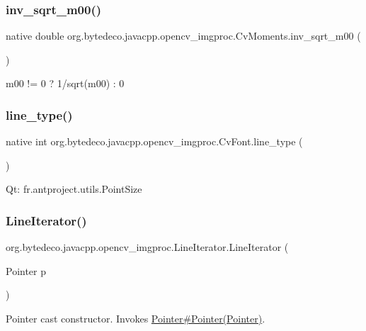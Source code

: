 \subsubsection{\texorpdfstring{inv\+\_\+sqrt\+\_\+m00()}{inv\_sqrt\_m00()}}
{\footnotesize\ttfamily native double org.\+bytedeco.\+javacpp.\+opencv\+\_\+imgproc.\+Cv\+Moments.\+inv\+\_\+sqrt\+\_\+m00 (\begin{DoxyParamCaption}{ }\end{DoxyParamCaption})}

m00 != 0 ? 1/sqrt(m00) \+: 0 \mbox{\label{group__imgproc_gaa10a37186c21769dac36657ca65b282c}} 
\subsubsection{\texorpdfstring{line\+\_\+type()}{line\_type()}}
{\footnotesize\ttfamily native int org.\+bytedeco.\+javacpp.\+opencv\+\_\+imgproc.\+Cv\+Font.\+line\+\_\+type (\begin{DoxyParamCaption}{ }\end{DoxyParamCaption})}

Qt\+: fr.antproject.utils.Point\+Size \mbox{\label{group__imgproc_gab596cb042f00fd0833e914b7ea024342}}
\subsubsection{\texorpdfstring{Line\+Iterator()}{LineIterator()}\hspace{0.1cm}{\footnotesize\ttfamily [1/2]}}
{\footnotesize\ttfamily org.\+bytedeco.\+javacpp.\+opencv\+\_\+imgproc.\+Line\+Iterator.\+Line\+Iterator (\begin{DoxyParamCaption}\item[{Pointer}]{p }\end{DoxyParamCaption})\hspace{0.3cm}{\ttfamily [inline]}}

Pointer cast constructor. Invokes \hyperlink{}{Pointer\#\+Pointer(\+Pointer)}. \mbox{\label{group__imgproc_ga56929bab5a89ba1c9bc2e00073eaedb4}} 
